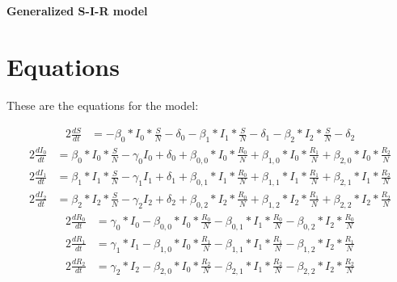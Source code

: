 \documentclass{article}%
\begin{document}
%
\normalsize%
\begin{center}%
\section*{}%
\label{sec:}%
\begin{Large}%
\textbf{Generalized S{-}I{-}R model}%
\end{Large}

%
\end{center}%
\section{Equations}%
\label{sec:Equations}%
\begin{large}%
These are the equations for the model:%
\end{large}

%
\begin{alignat*}{2}%
\frac{dS}{dt} &= -\beta_{0}*I_{0} * \frac{S}{N}- \delta_{0} -\beta_{1}*I_{1} * \frac{S}{N}- \delta_{1} -\beta_{2}*I_{2} * \frac{S}{N}- \delta_{2}%
\end{alignat*}%
\begin{alignat*}{2}%
\frac{dI_{0}}{dt} &= \beta_{0}*I_{0} * \frac{S}{N} -\gamma_{0}I_{0}+ \delta_{0} +  \beta_{0,0} * I_{0} * \frac{R_{0}}{N} +  \beta_{1,0} * I_{0} * \frac{R_{1}}{N} +  \beta_{2,0} * I_{0} * \frac{R_{2}}{N}%
\end{alignat*}%
\begin{alignat*}{2}%
\frac{dI_{1}}{dt} &= \beta_{1}*I_{1} * \frac{S}{N} -\gamma_{1}I_{1}+ \delta_{1} +  \beta_{0,1} * I_{1} * \frac{R_{0}}{N} +  \beta_{1,1} * I_{1} * \frac{R_{1}}{N} +  \beta_{2,1} * I_{1} * \frac{R_{2}}{N}%
\end{alignat*}%
\begin{alignat*}{2}%
\frac{dI_{2}}{dt} &= \beta_{2}*I_{2} * \frac{S}{N} -\gamma_{2}I_{2}+ \delta_{2} +  \beta_{0,2} * I_{2} * \frac{R_{0}}{N} +  \beta_{1,2} * I_{2} * \frac{R_{1}}{N} +  \beta_{2,2} * I_{2} * \frac{R_{2}}{N}%
\end{alignat*}%
\begin{alignat*}{2}%
\frac{dR_{0}}{dt} &= \gamma_{0}*I_{0}- \beta_{0,0} * I_{0} * \frac{R_{0}}{N}- \beta_{0,1} * I_{1} * \frac{R_{0}}{N}- \beta_{0,2} * I_{2} * \frac{R_{0}}{N}%
\end{alignat*}%
\begin{alignat*}{2}%
\frac{dR_{1}}{dt} &= \gamma_{1}*I_{1}- \beta_{1,0} * I_{0} * \frac{R_{1}}{N}- \beta_{1,1} * I_{1} * \frac{R_{1}}{N}- \beta_{1,2} * I_{2} * \frac{R_{1}}{N}%
\end{alignat*}%
\begin{alignat*}{2}%
\frac{dR_{2}}{dt} &= \gamma_{2}*I_{2}- \beta_{2,0} * I_{0} * \frac{R_{2}}{N}- \beta_{2,1} * I_{1} * \frac{R_{2}}{N}- \beta_{2,2} * I_{2} * \frac{R_{2}}{N}%
\end{alignat*}%
\end{document}
